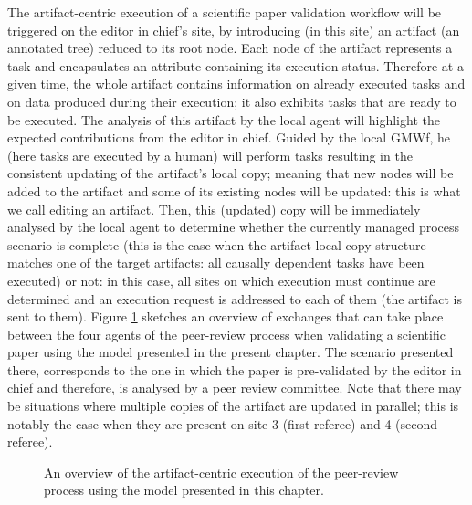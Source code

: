 The artifact-centric execution of a scientific paper validation workflow will be triggered on the editor in chief's site, by introducing (in this site) an artifact (an annotated tree) reduced to its root node. Each node of the artifact represents a task and encapsulates an attribute containing its execution status. Therefore at a given time, the whole artifact contains information on already executed tasks and on data produced during their execution; it also exhibits tasks that are ready to be executed.
The analysis of this artifact by the local agent will highlight the expected contributions from the editor in chief. Guided by the local GMWf, he (here tasks are executed by a human) will perform tasks resulting in the consistent updating of the artifact's local copy; meaning that new nodes will be added to the artifact and some of its existing nodes will be updated: this is what we call editing an artifact. Then, this (updated) copy will be immediately analysed by the local agent to determine whether the currently managed process scenario is complete (this is the case when the artifact local copy structure matches one of the target artifacts: all causally dependent tasks have been executed) or not: in this case, all sites on which execution must continue are determined and an execution request is addressed to each of them (the artifact is sent to them).
Figure \ref{chap3:fig:overview-example} sketches an overview of exchanges that can take place between the four agents of the peer-review process when validating a scientific paper using the model presented in the present chapter. The scenario presented there, corresponds to the one in which the paper is pre-validated by the editor in chief and therefore, is analysed by a peer review committee. Note that there may be situations where multiple copies of the artifact are updated in parallel; this is notably the case when they are present on site 3 (first referee) and 4 (second referee).
\begin{figure}[ht!]
	\noindent
	\caption{An overview of the artifact-centric execution of the peer-review process using the model presented in this chapter.}
	\label{chap3:fig:overview-example}
\end{figure}
